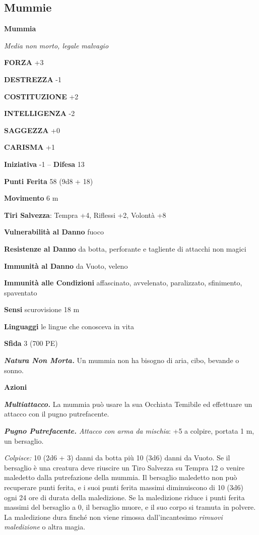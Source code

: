 \begin{multicols}{2}
\subsection{Mummie}

\medskip{}\textbf{Mummia}

\emph{Media non morto, legale malvagio}

\textbf{FORZA} +3

\textbf{DESTREZZA} -1

\textbf{COSTITUZIONE} +2

\textbf{INTELLIGENZA} -2

\textbf{SAGGEZZA} +0

\textbf{CARISMA} +1

\textbf{Iniziativa} -1 -- \textbf{Difesa} 13

\textbf{Punti Ferita} 58 (9d8 + 18)

\textbf{Movimento} 6 m

\textbf{Tiri Salvezza}: Tempra +4, Riflessi +2, Volontà +8

\textbf{Vulnerabilità al Danno} fuoco

\textbf{Resistenze al Danno} da botta, perforante e tagliente di attacchi non magici

\textbf{Immunità al Danno} da Vuoto, veleno

\textbf{Immunità alle Condizioni} affascinato, avvelenato, paralizzato, sfinimento, spaventato

\textbf{Sensi} scurovisione 18 m 

\textbf{Linguaggi} le lingue che conosceva in vita

\textbf{Sfida} 3 (700 PE)

\emph{\textbf{Natura Non Morta.}} Un mummia non ha bisogno di aria, cibo, bevande o sonno.

\textbf{Azioni}

\emph{\textbf{Multiattacco.}} La mummia può usare la sua Occhiata Temibile ed effettuare un attacco con il pugno putrefacente.

\emph{\textbf{Pugno Putrefacente.} Attacco con arma da mischia}: +5 a colpire, portata 1 m, un bersaglio.

\emph{Colpisce:} 10 (2d6 + 3) danni da botta più 10 (3d6) danni da Vuoto. Se il bersaglio è una creatura deve riuscire un Tiro Salvezza su Tempra 12 o venire maledetto dalla putrefazione della mummia. Il bersaglio maledetto non può recuperare punti ferita, e i suoi punti ferita massimi diminuiscono di 10 (3d6) ogni 24 ore di durata della maledizione. Se la maledizione riduce i punti ferita massimi del bersaglio a 0, il bersaglio muore, e il suo corpo si tramuta in polvere. La maledizione dura finché non viene rimossa dall'incantesimo \emph{rimuovi maledizione} o altra magia.


\end{multicols}
